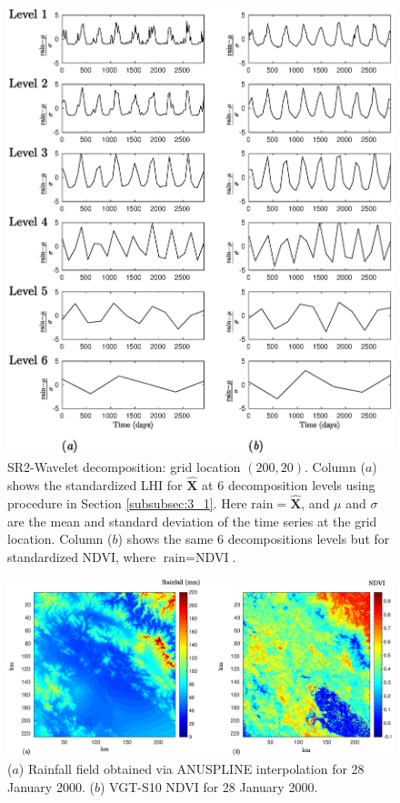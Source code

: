{\begin{figure}[!htbp]
\begin{center}
\includegraphics[width=0.8\columnwidth]{fig/point200_20KrigingGG}
\vspace*{-0.2in}
\caption{SR2-Wavelet decomposition: grid location $(200,20)$. 
Column ($a$) shows the standardized LHI for $\bm{\hat{X}}$ at $6$ decomposition levels using procedure in Section \ref{subsubsec:3_1}. Here $\text{rain} = \bm{\hat{X}}$, and $\mu$ and $\sigma$ are the mean and standard deviation of the time series at the grid location. Column ($b$) shows the same $6$ decompositions levels but for standardized NDVI, where $\text{rain} = \text{NDVI}$.}
\label{fig:level_decomposition6}
\end{center}
\end{figure}


\vspace*{-0.5in}
\begin{figure}[!htbp]
	\begce
	\includegraphics[width=\columnwidth]{fig/NDVI_ANUSPLINE}
	\endce
	\caption{($a$) Rainfall field obtained via ANUSPLINE interpolation for 28 January 2000. ($b$) VGT-S10 NDVI for 28 January 2000. %
	}
	\label{fig:NDVI_ANUSLINE}
\end{figure}



}
